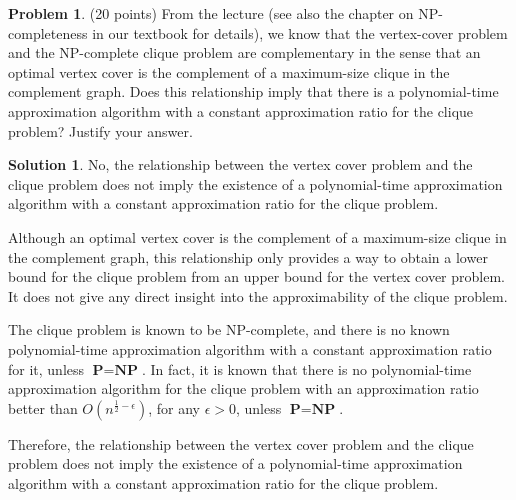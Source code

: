 \documentclass{article}
\theoremstyle{definition}
\newtheorem{problem}{Problem}
\newtheorem*{solution}{Solution}
\begin{document}
\clearpage
\begin{problem} (20 points) From the lecture (see also the chapter on
  NP-completeness in our textbook for details), we know that the
  vertex-cover problem and the NP-complete clique problem are
  complementary in the sense that an optimal vertex cover is the
  complement of a maximum-size clique in the complement graph. Does
  this relationship imply that there is a polynomial-time
  approximation algorithm with a constant approximation ratio for the
  clique problem? Justify your answer.
\end{problem}
\begin{solution}
No, the relationship between the vertex cover problem and the clique problem does not imply the existence of a polynomial-time approximation algorithm with a constant approximation ratio for the clique problem.

\noindent
Although an optimal vertex cover is the complement of a maximum-size clique in the complement graph, this relationship only provides a way to obtain a lower bound for the clique problem from an upper bound for the vertex cover problem.
It does not give any direct insight into the approximability of the clique problem.

\noindent
The clique problem is known to be NP-complete, and there is no known polynomial-time approximation algorithm with a constant approximation ratio for it, unless $\textbf{P}=\textbf{NP}$. In fact, it is known that there is no polynomial-time approximation algorithm for the clique problem with an approximation ratio better than $\displaystyle O\left(n^{\frac{1}{2}-\epsilon}\right)$, for any $\epsilon>0$, unless $\textbf{P}=\textbf{NP}$.

\noindent
Therefore, the relationship between the vertex cover problem and the clique problem does not imply the existence of a polynomial-time approximation algorithm with a constant approximation ratio for the clique problem.
\end{solution}
\end{document}
